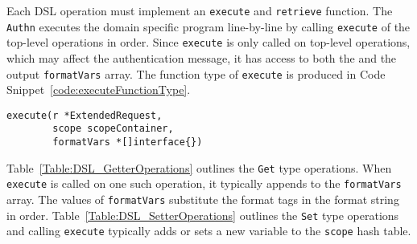 
Each DSL operation must implement an \lstinline{execute} and \lstinline{retrieve} function. The \lstinline{Authn} executes the domain specific program line-by-line by calling \lstinline{execute} of the top-level operations in order. Since \lstinline{execute} is only called on top-level operations, which may affect the authentication message, it has access to both the  and the output \lstinline{formatVars} array. The function type of \lstinline{execute} is produced in Code Snippet~\ref{code:executeFunctionType}.




\begin{lstlisting}[float=h,label=code:executeFunctionType,caption=The function type of the \lstinline{execute} function.]
execute(r *ExtendedRequest, 
        scope scopeContainer, 
        formatVars *[]interface{})
\end{lstlisting}

Table~\ref{Table:DSL_GetterOperations} outlines the \lstinline{Get} type operations. When \lstinline{execute} is called on one such operation, it typically appends to the \lstinline{formatVars} array. The values of \lstinline{formatVars} substitute the format tags in the format string in order. Table~\ref{Table:DSL_SetterOperations} outlines the \lstinline{Set} type operations and calling \lstinline{execute} typically adds or sets a new variable to the \lstinline{scope} hash table.


